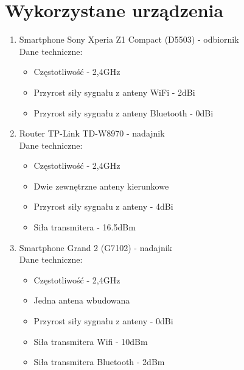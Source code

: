 \section{Wykorzystane urządzenia}
\begin{enumerate}
	\item Smartphone Sony Xperia Z1 Compact (D5503) - odbiornik\\				
	Dane techniczne:
	\begin{itemize}
		\item Częstotliwość - 2,4GHz
		\item Przyrost siły sygnału z anteny WiFi - 2dBi
		\item Przyrost siły sygnału z anteny Bluetooth - 0dBi
	\end{itemize}
	\item Router TP-Link TD-W8970 - nadajnik\\
	Dane techniczne:
	\begin{itemize}
		\item Częstotliwość - 2,4GHz
		\item Dwie zewnętrzne anteny kierunkowe
		\item Przyrost siły sygnału z anteny - 4dBi
		\item Siła transmitera - 16.5dBm					
	\end{itemize}
	\item Smartphone Grand 2 (G7102) - nadajnik\\
	Dane techniczne:
	\begin{itemize}
		\item Częstotliwość - 2,4GHz
		\item Jedna antena wbudowana
		\item Przyrost siły sygnału z anteny - 0dBi
		\item Siła transmitera Wifi - 10dBm
		\item Siła transmitera Bluetooth - 2dBm				
	\end{itemize}
\end{enumerate}
